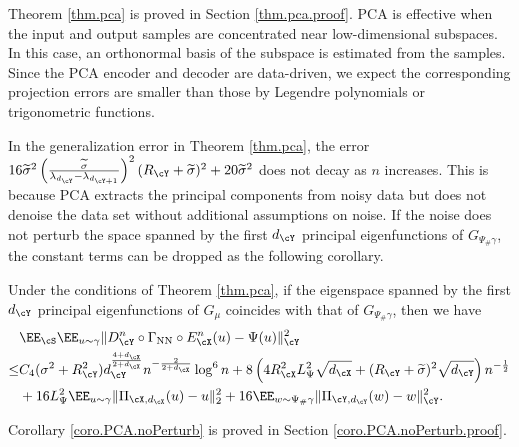 \documentclass[11pt]{article} %
\begin{document}
Theorem \ref{thm.pca} is proved in Section \ref{thm.pca.proof}. PCA is effective when the input and output samples are concentrated near  low-dimensional subspaces. In this case, an orthonormal basis of the subspace is estimated from the samples. Since the PCA encoder and decoder are data-driven, we expect the corresponding projection errors are smaller than those by Legendre polynomials or trigonometric functions. 

In the generalization error in Theorem \ref{thm.pca}, the error $16\widetilde{\sigma}^2\left(\frac{\widetilde{\sigma}}{\lambda_{d_{\cY}}-\lambda_{d_{\cY+1}}}\right)^2(R_{\cY} +\widetilde{\sigma})^2+ 20\widetilde{\sigma}^2$ does not decay as $n$ increases. %
This is because PCA extracts the principal components from noisy data but does not denoise the data set without additional assumptions on noise. If the noise does not perturb the space spanned by the first $d_{\cY}$ principal eigenfunctions of $G_{\Psi_{\#}\gamma}$, the constant terms can be dropped as the following corollary.
\begin{corollary}\label{coro.PCA.noPerturb}
	Under the conditions of Theorem \ref{thm.pca}, if the eigenspace spanned by the first $d_{\cY}$ principal eigenfunctions of $G_{\mu}$ coincides with that of $G_{\Psi_{\#}\gamma}$, then we have
	\begin{align*}
		&\EE_{\cS}\EE_{u\sim \gamma}\|D_{\cY}^n\circ \Gamma_{\rm NN} \circ E_{\cX}^n(u)- \Psi(u)\|_{\cY}^2 \\
		\leq& C_{4}(\sigma^2+R_{\cY}^2)d_{\cY}^{\frac{4+d_{\cX}}{2+d_{\cX}}}n^{-\frac{2}{2+d_{\cX}}}\log^6 n +8\left(4R^2_{\cX}L_{\Psi}^2\sqrt{d_{\cX}}+(R_{\cY}+\widetilde{\sigma})^2\sqrt{d_{\cY}}\right)n^{-\frac{1}{2}}\nonumber\\ 
		&+ 16L_{\Psi}^2\EE_{u\sim \gamma}\| \Pi_{\cX,d_{\cX}}(u)-u\|_{2}^2+16\EE_{w\sim \Psi_{\#}\gamma}\|\Pi_{\cY,d_{\cY}}(w)- w\|_{\cY}^2.
	\end{align*}
\end{corollary}
Corollary \ref{coro.PCA.noPerturb} is proved in Section \ref{coro.PCA.noPerturb.proof}.
\end{document}
